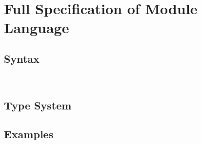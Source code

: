\section{Full Specification of Module Language}

\subsection{Syntax}
\gram{\otte\ottinterrule
      \ottpgm\ottinterrule
      \ottdecl\ottinterrule
      \ottM\ottinterrule
      \ottS\ottinterrule
      \ottG\ottinterrule
      \ottv}
\\[2.0mm]


\subsection{Type System}






\subsection{Examples}



